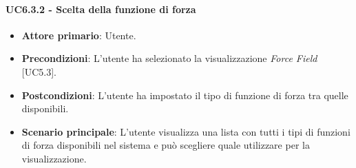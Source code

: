\paragraph{UC6.3.2 - Scelta della funzione di forza}
\begin{itemize}
	\item \textbf{Attore primario}: Utente.
	\item \textbf{Precondizioni}: L'utente ha selezionato la visualizzazione \textit{Force Field} [UC5.3].
	\item \textbf{Postcondizioni}: L'utente ha impostato il tipo di funzione di forza tra quelle disponibili.
	
	\item \textbf{Scenario principale}: L'utente visualizza una lista con tutti i tipi di funzioni di forza disponibili nel sistema e può scegliere quale utilizzare per la visualizzazione.
\end{itemize}